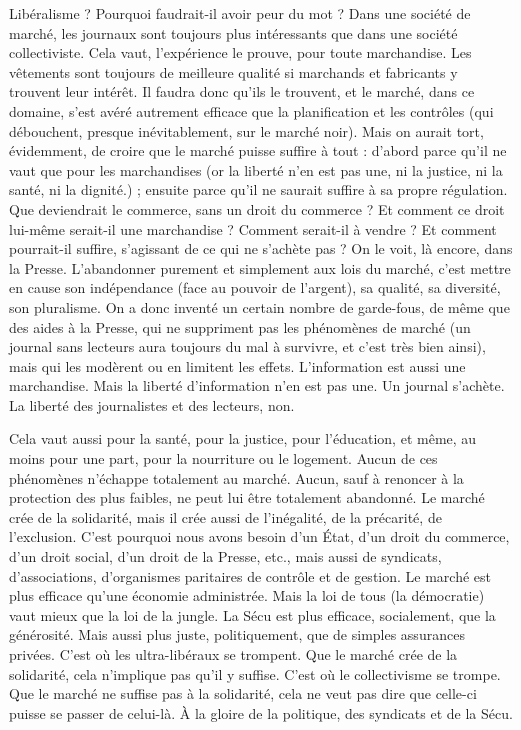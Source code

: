 Libéralisme ? Pourquoi faudrait-il avoir peur du mot ? Dans une société de
marché, les journaux sont toujours plus intéressants que dans une société collectiviste.
Cela vaut, l'expérience le prouve, pour toute marchandise. Les vêtements
sont toujours de meilleure qualité si marchands et fabricants y trouvent
leur intérêt. Il faudra donc qu’ils le trouvent, et le marché, dans ce domaine,
s’est avéré autrement efficace que la planification et les contrôles (qui débouchent,
presque inévitablement, sur le marché noir). Mais on aurait tort, évidemment,
de croire que le marché puisse suffire à tout : d’abord parce qu’il ne
vaut que pour les marchandises (or la liberté n’en est pas une, ni la justice, ni
la santé, ni la dignité.) ; ensuite parce qu’il ne saurait suffire à sa propre régulation.
Que deviendrait le commerce, sans un droit du commerce ? Et comment
ce droit lui-même serait-il une marchandise ? Comment serait-il à
vendre ? Et comment pourrait-il suffire, s’agissant de ce qui ne s’achète pas ?
On le voit, là encore, dans la Presse. L’abandonner purement et simplement
aux lois du marché, c’est mettre en cause son indépendance (face au pouvoir de
l'argent), sa qualité, sa diversité, son pluralisme. On a donc inventé un certain
nombre de garde-fous, de même que des aides à la Presse, qui ne suppriment
pas les phénomènes de marché (un journal sans lecteurs aura toujours du mal à
survivre, et c’est très bien ainsi), mais qui les modèrent ou en limitent les effets.
L'information est aussi une marchandise. Mais la liberté d’information n’en est
pas une. Un journal s’achète. La liberté des journalistes et des lecteurs, non.

Cela vaut aussi pour la santé, pour la justice, pour l’éducation, et même, au
moins pour une part, pour la nourriture ou le logement. Aucun de ces phénomènes
n'échappe totalement au marché. Aucun, sauf à renoncer à la protection
des plus faibles, ne peut lui être totalement abandonné. Le marché crée de la
solidarité, mais il crée aussi de l’inégalité, de la précarité, de l'exclusion. C’est
pourquoi nous avons besoin d’un État, d’un droit du commerce, d’un droit
social, d’un droit de la Presse, etc., mais aussi de syndicats, d’associations,
d'organismes paritaires de contrôle et de gestion. Le marché est plus efficace
qu’une économie administrée. Mais la loi de tous (la démocratie) vaut mieux
que la loi de la jungle. La Sécu est plus efficace, socialement, que la générosité.
Mais aussi plus juste, politiquement, que de simples assurances privées. C’est
où les ultra-libéraux se trompent. Que le marché crée de la solidarité, cela
n'implique pas qu’il y suffise. C’est où le collectivisme se trompe. Que le
marché ne suffise pas à la solidarité, cela ne veut pas dire que celle-ci puisse se
passer de celui-là. À la gloire de la politique, des syndicats et de la Sécu.

